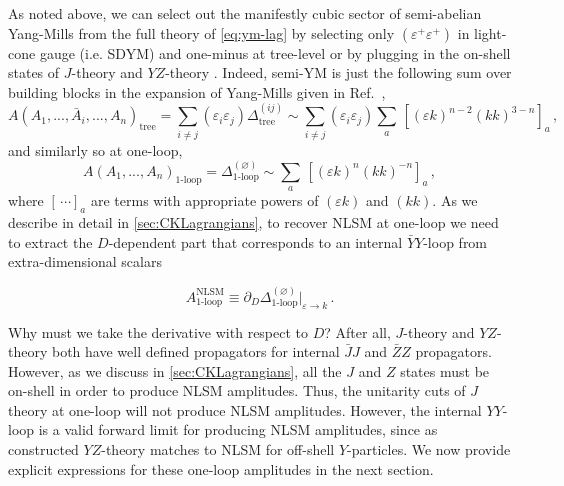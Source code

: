 \documentclass[11pt,letter]{article}
\begin{document}
As noted above, we can select out the manifestly cubic
sector of semi-abelian Yang-Mills from the full theory of \cref{eq:ym-lag} by selecting only $(\varepsilon^+\varepsilon^+)$ in light-cone gauge (i.e. SDYM) and one-minus at tree-level or by plugging in the on-shell states of $J$-theory \cite{Cheung:2020djz,Cheung:2021zvb} and
$YZ$-theory \cite{Cheung:2016prv}. Indeed, semi-YM is just the following sum over building blocks
in the expansion of Yang-Mills given in Ref.~\cite{Pavao:2022kog},
\begin{equation}
A(A_1,...,\bar{A}_i,...,A_n)_{\text{tree}} = \sum_{i\neq j} (\varepsilon_i \varepsilon_j) \Delta^{(ij)}_{\text{tree}} \sim \sum_{i\neq j} (\varepsilon_i \varepsilon_j)  \sum_a \,[(\varepsilon k)^{n-2} (kk)^{3-n}]_a\,,
\end{equation}
and similarly so at one-loop,
\begin{equation}
A(A_1,...,A_n)_{\text{1-loop}} = \Delta^{(\varnothing)}_{\text{1-loop}} \sim \sum_a\,[ (\varepsilon k)^{n} (kk)^{-n}]_a\,,
\end{equation}
where $[\,\cdots]_a$ are terms with appropriate powers of $(\varepsilon k)$ and $(kk)$. As we describe in detail in \cref{sec:CKLagrangians}, to recover NLSM at one-loop we need to extract the $D$-dependent part
that corresponds to an internal $\bar{Y}Y$-loop from extra-dimensional
scalars
\begin{eBox}
\begin{equation}
A^{\text{NLSM}}_{\text{1-loop}} \equiv \partial_D \Delta^{(\varnothing)}_{\text{1-loop}}\big|_{\varepsilon\rightarrow k}\, .
\end{equation}
\end{eBox}
Why must we take the derivative with respect to $D$? After all,
$J$-theory and $YZ$-theory both have well defined propagators for
internal $\bar{J}J$ and $\bar{Z}Z$ propagators. However, as we discuss
in \cref{sec:CKLagrangians}, all the $J$ and $Z$ states must be on-shell in order to
produce NLSM amplitudes. Thus, the unitarity cuts of $J$ theory at
one-loop will not produce NLSM amplitudes. However, the internal
$YY$-loop is a valid forward limit for producing NLSM amplitudes,
since as constructed $YZ$-theory matches to NLSM for off-shell
$Y$-particles. We now provide explicit expressions for these one-loop amplitudes in the next section.
\end{document}
